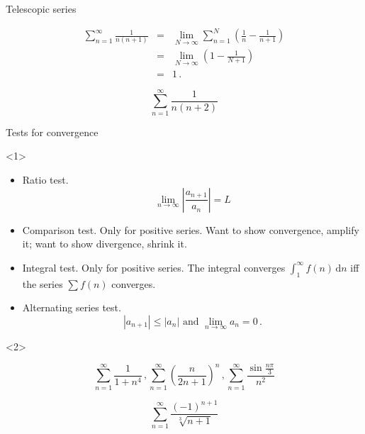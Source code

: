 \begin{frame}{Telescopic series}


\begin{eqnarray*}
\sum_{n=1}^{\infty}\frac{1}{n\left(n+1\right)} & = & \lim_{N\to\infty}\sum_{n=1}^{N}\left(\frac{1}{n}-\frac{1}{n+1}\right)\\
 & = & \lim_{N\to\infty}\left(1-\frac{1}{N+1}\right)\\
 & = & 1\,.
\end{eqnarray*}

\begin{example}
\[
\sum_{n=1}^{\infty}\frac{1}{n\left(n+2\right)}
\]

\end{example}

\end{frame}

\begin{frame}{Tests for convergence}

\begin{onlyenv}<1>

\begin{itemize}
\item Ratio test.
\[
\lim_{n\to\infty}\left|\frac{a_{n+1}}{a_{n}}\right|=L
\]

\item Comparison test. Only for positive series. Want to show convergence,
amplify it; want to show divergence, shrink it.
\item Integral test. Only for positive series. The integral converges $\int_{1}^{\infty}f\left(n\right)\,\mathrm{d}n$
iff the series $\sum f\left(n\right)$ converges.
\item Alternating series test.
\[
\left|a_{n+1}\right|\le\left|a_{n}\right|\mbox{ and }\lim_{n\to\infty}a_{n}=0\,.
\]

\end{itemize}
\end{onlyenv}



\begin{onlyenv}<2>

\begin{example}
\[
\sum_{n=1}^{\infty}\frac{1}{1+n^{4}}\,,\sum_{n=1}^{\infty}\left(\frac{n}{2n+1}\right)^{n}\,,\sum_{n=1}^{\infty}\frac{\sin\frac{n\pi}{3}}{n^{2}}
\]

\end{example}



\begin{example}
\[
\sum_{n=1}^{\infty}\frac{\left(-1\right)^{n+1}}{\sqrt[3]{n+1}}
\]

\end{example}

\end{onlyenv}

\end{frame}

